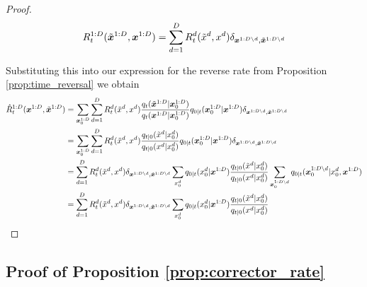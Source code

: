\documentclass{article}
\begin{document}
\begin{proof}
\begin{equation}
    R_t^{1:D}(\tilde{\bm{x}}^{1:D}, \bm{x}^{1:D}) = \sum_{d=1}^D R_t^d(\tilde{x}^d, x^d) \delta_{\bm{x}^{1:D \backslash d}, \tilde{\bm{x}}^{1:D \backslash d}}
\end{equation}



















Substituting this into our expression for the reverse rate from Proposition \ref{prop:time_reversal} we obtain
\begin{align}
    \hat{R}_t^{1:D}(\bm{x}^{1:D}, \tilde{\bm{x}}^{1:D}) &= \sum_{\bm{x}_0^{1:D}} \sum_{d=1}^D R_t^d(\tilde{x}^d, x^d) \frac{q_t(\tilde{\bm{x}}^{1:D} | \bm{x}_0^{1:D})}{q_t(\bm{x}^{1:D} | \bm{x}_0^{1:D})} q_{0|t}(\bm{x}_0^{1:D} | \bm{x}^{1:D}) \delta_{\bm{x}^{1:D \backslash d}, \tilde{\bm{x}}^{1:D \backslash d}}\\
    &= \sum_{\bm{x}_0^{1:D}} \sum_{d=1}^D R_t^d(\tilde{x}^d, x^d) \frac{q_{t|0}(\tilde{x}^{d} | x_0^{d})}{q_{t|0}(x^{d} | x_0^{d})} q_{0|t}(\bm{x}_0^{1:D} | \bm{x}^{1:D}) \delta_{\bm{x}^{1:D \backslash d}, \tilde{\bm{x}}^{1:D \backslash d}}\\
    &= \sum_{d=1}^D R_t^d(\tilde{x}^d, x^d) \delta_{\bm{x}^{1:D \backslash d}, \tilde{\bm{x}}^{1:D \backslash d}} \sum_{x_0^d} q_{0|t}(x_0^d | \bm{x}^{1:D}) \frac{q_{t|0}(\tilde{x}^d | x_0^d)}{q_{t|0}(x^d | x_0^d)} \sum_{\bm{x}_0^{1:D \backslash d}} q_{0|t}(\bm{x}_0^{1:D \backslash d} | x_0^d, \bm{x}^{1:D})\\
    &= \sum_{d=1}^D R_t^d(\tilde{x}^d, x^d) \delta_{\bm{x}^{1:D \backslash d}, \tilde{\bm{x}}^{1:D \backslash d}} \sum_{x_0^d} q_{0|t}(x_0^d | \bm{x}^{1:D}) \frac{q_{t|0}(\tilde{x}^d | x_0^d)}{q_{t|0}(x^d | x_0^d)}
\end{align}
\end{proof}










\subsection{Proof of Proposition \ref{prop:corrector_rate}}
\end{document}
